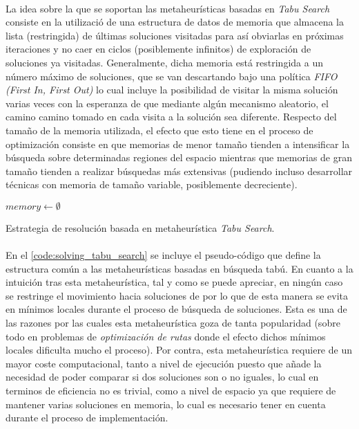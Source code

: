 \documentclass{subfiles}
\begin{document}
        \paragraph{}
        La idea sobre la que se soportan las metaheurísticas basadas en \emph{Tabu Search} consiste en la utilizació de una estructura de datos de memoria que almacena la lista (restringida) de últimas soluciones visitadas para así obviarlas en próximas iteraciones y no caer en ciclos (posiblemente infinitos) de exploración de soluciones ya visitadas. Generalmente, dicha memoria está restringida a un número máximo de soluciones, que se van descartando bajo una política \emph{FIFO (First In, First Out)} lo cual incluye la posibilidad de visitar la misma solución varias veces con la esperanza de que mediante algún mecanismo aleatorio, el camino camino tomado en cada visita a la solución sea diferente. Respecto del tamaño de la memoria utilizada, el efecto que esto tiene en el proceso de optimización consiste en que memorias de menor tamaño tienden a intensificar la búsqueda sobre determinadas regiones del espacio mientras que memorias de gran tamaño tienden a realizar búsquedas más extensivas (pudiendo incluso desarrollar técnicas con memoria de tamaño variable, posiblemente decreciente).

        \begin{algorithm}[ht]
          \SetAlgoLined
          $memory \gets \emptyset$\;
          \caption{Estrategia de resolución basada en metaheurística \emph{Tabu Search}.}
          \label{code:solving_tabu_search}
        \end{algorithm}

        \paragraph{}
        En el \cref{code:solving_tabu_search} se incluye el pseudo-código que define la estructura común a las metaheurísticas basadas en búsqueda tabú. En cuanto a la intuición tras esta metaheurística, tal y como se puede apreciar, en ningún caso se restringe el movimiento hacia soluciones de  por lo que de esta manera se evita  en mínimos locales durante el proceso de búsqueda de soluciones. Esta es una de las razones por las cuales esta metaheurística goza de tanta popularidad (sobre todo en problemas de \emph{optimización de rutas} donde el efecto dichos mínimos locales dificulta mucho el proceso). Por contra, esta metaheurística requiere de un mayor coste computacional, tanto a nivel de ejecución puesto que añade la necesidad de poder comparar si dos soluciones son o no iguales, lo cual en terminos de eficiencia no es trivial, como a nivel de espacio ya que requiere de mantener varias soluciones en memoria, lo cual es necesario tener en cuenta durante el proceso de implementación.
\end{document}
